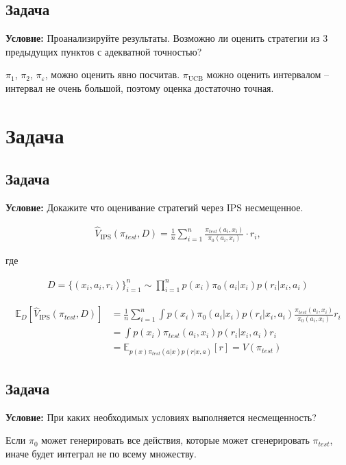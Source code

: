 \documentclass[a4paper,12pt]{article}
\begin{document}
\subsection{Задача}
    \textbf{Условие:} Проанализируйте результаты. Возможно ли оценить стратегии из 3 предыдущих пунктов с адекватной точностью?

    $\pi_1$, $\pi_2$, $\pi_{\varepsilon}$, можно оценить явно посчитав. $\pi_\text{UCB}$ можно оценить интервалом -- интервал не очень большой, поэтому оценка достаточно точная.

\section{Задача}

\subsection{Задача}
    \textbf{Условие:} Докажите что оценивание стратегий через IPS несмещенное.

    \begin{align*}
        \hat{V}_{\text{IPS}} (\pi_{test}, D) = \frac{1}{n} \sum_{i = 1}^n \frac{\pi_{test} (a_i, x_i)}{\pi_0 (a_i, x_i)} \cdot r_i, 
    \end{align*}

    где

    \begin{align*}
        D = \{ (x_i, a_i, r_i)\}_{i = 1}^n \sim \prod_{i = 1}^n p (x_i) \pi_0 (a_i|x_i) p(r_i|x_i, a_i)
    \end{align*}

    \begin{align*}
        \mathbb{E}_D \left[ \hat{V}_{\text{IPS}} (\pi_{test}, D) \right]
        &=
        \frac{1}{n} \sum_{i = 1}^n \int p (x_i) \pi_0 (a_i|x_i) p(r_i|x_i, a_i) \frac{\pi_{test} (a_i, x_i)}{\pi_0 (a_i, x_i)} r_i \\
        &=
        \int p (x_i) \pi_{test} (a_i, x_i) p(r_i|x_i, a_i) r_i\\
        &=
        \mathbb{E}_{p(x) \pi_{test} (a|x) p(r|x, a)}[r] = V(\pi_{test})
    \end{align*}


\subsection{Задача}
    \textbf{Условие:} При каких необходимых условиях выполняется несмещенность?

    Если $\pi_0$ может генерировать все действия, которые может сгенерировать $\pi_{test}$, иначе будет интеграл не по всему множеству.
\end{document}
